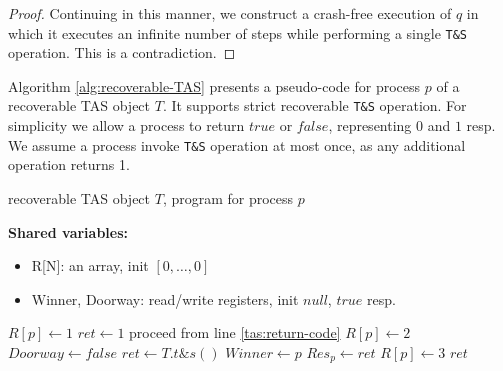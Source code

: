 \begin{proof}
Continuing in this manner, we construct a crash-free execution of $q$ in which it executes an infinite number of steps while performing a single \texttt{T\&S} operation. This is a contradiction.
\end{proof}

Algorithm \ref{alg:recoverable-TAS} presents a pseudo-code for process $p$ of a recoverable TAS object $T$. It supports strict recoverable \texttt{T\&S} operation.
For simplicity we allow a process to return $true$ or $false$, representing $0$ and $1$ resp. We assume a process invoke \texttt{T\&S} operation at most once, as any additional operation returns 1.


\begin{algorithm}[b]%
	\caption{recoverable TAS object $T$, program for process $p$}
	\label{alg:recoverable-TAS}
	
	\hspace*{\algorithmicindent} \textbf{Shared variables:}
	\begin{itemize}[noitemsep,topsep=0pt]
		\item R[N]: an array, init $[0,\ldots,0]$
		\item Winner, Doorway: read/write registers, init $null$, $true$ resp.
	\end{itemize}
	
	\begin{multicols}{2}
		\begin{algorithmic}[1]
			\State $R[p] \gets 1$ \label{tas:start}
			 \label{tas:check-doorway}
			\State $ret \gets 1$ \label{tas:doorway-return-1}
			\State proceed from line \ref{tas:return-code}
			\EndIf
			\State $R[p] \gets 2$ \label{tas:set-R[p]-2}
			\State $Doorway \gets false$ \label{tas:close-doorway}
			\State $ret \gets T.t\&s()$ \label{tas:tas-primitive}
			\State $Winner \gets p$ \label{tas:write-to-winner}
			\EndIf
			\State $Res_p \gets ret$ \label{tas:return-code}
			\State $R[p] \gets 3$ \label{tas:set-R[p]-3}
			\State \Return $ret$
			\EndProcedure
			
			\columnbreak
			

\end{algorithmic}
\end{multicols}
\end{algorithm}
